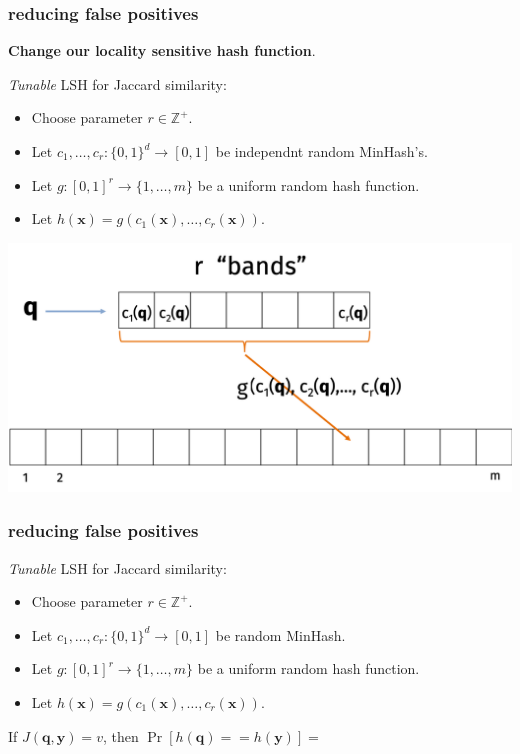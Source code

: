 \documentclass[compress]{beamer}
\newcommand{\bv}[1]{\mathbf{#1}}
\begin{document}
\begin{frame}[t]
	\frametitle{reducing false positives}
	\small
	\vspace{-.5em}
	\begin{center}
	\textbf{Change our locality sensitive hash function}.
	\vspace{-.5em}
	\end{center}
	\emph{Tunable} LSH for Jaccard similarity:
	\vspace{-.5em}
	\begin{itemize}
		\item Choose parameter $r \in \mathbb{Z}^+$.
		\item Let $c_1, \ldots, c_r: \{0,1\}^d \rightarrow [0,1]$ be independnt random MinHash's.
		\item Let $g: [0,1]^r \rightarrow \{1, \ldots, m\}$ be a uniform random hash function.
		\item Let $h(\bv{x}) = g(c_1(\bv{x}), \ldots, c_r(\bv{x})).$
	\end{itemize}
\vspace{-1em}
	\begin{center}
			\includegraphics[width=.8\textwidth]{banded_hash.png}
	\end{center}


\end{frame}

\begin{frame}[t]
	\frametitle{reducing false positives}
	\small
	\emph{Tunable} LSH for Jaccard similarity:
	\begin{itemize}
		\item Choose parameter $r \in \mathbb{Z}^+$.
		\item Let $c_1, \ldots, c_r: \{0,1\}^d \rightarrow [0,1]$ be random MinHash.
		\item Let $g: [0,1]^r \rightarrow \{1, \ldots, m\}$ be a uniform random hash function.
		\item Let $h(\bv{x}) = g(c_1(\bv{x}), \ldots, c_r(\bv{x})).$
	\end{itemize}
	
	If $J(\bv{q},\bv{y}) = v$, then $\Pr\left[h(\bv{q}) == h(\bv{y})\right] = $
	
\end{frame}
\end{document}
